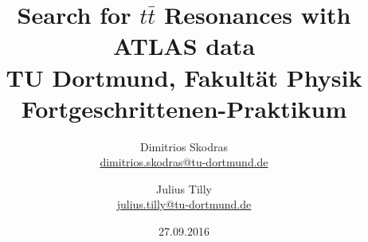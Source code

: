 

\usepackage{subcaption}
\usepackage{placeins}
\newcommand{\minwidth}{0.47}
\newcommand{\minwidththree}{0.49}



\title{Search for $t\bar t$ Resonances with ATLAS data \\ \vspace{.5cm}%
	\large TU Dortmund, Fakultät Physik\\ 
	\normalsize Fortgeschrittenen-Praktikum}

\author{Dimitrios Skodras\\			%
	{\small \href{dimitrios.skodras@tu-dortmund.de}{dimitrios.skodras@tu-dortmund.de}}	%
				\and			%
	Julius Tilly\\					%
	{\small \href{julius.tilly@tu-dortmund.de}{julius.tilly@tu-dortmund.de}}		%
}
\date{27.09.2016}				%



	

\maketitle					%
\thispagestyle{empty} 				%



\tableofcontents


\newpage					%


